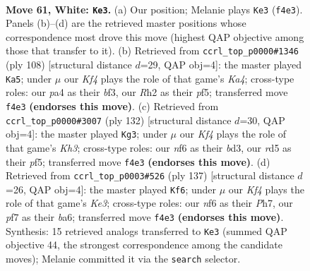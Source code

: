 \documentclass[11pt]{article}
\begin{document}
\clearpage

\begin{figure}[p]\centering
\begin{subfigure}{0.46\textwidth}\centering
\resizebox{\linewidth}{!}{%
\newchessgame
\chessboard[
  setfen={7k/5p2/5n2/3r4/pB3K1p/P4P1P/7R/8 w - - 1 61},
  showmover=false,
  pgfstyle=straightmove, color=movearrow, markmove={f4-e3}
]}
\caption{}
\end{subfigure}\hfill
\begin{subfigure}{0.46\textwidth}\centering
\resizebox{\linewidth}{!}{%
\newchessgame
\chessboard[
  setfen={8/7p/3B3P/2P2pp1/K1k5/P4bP1/8/8 w - - 1 55},
  showmover=false,
  pgfstyle=straightmove, color=movearrow, markmove={a4-a5}
]}
\caption{}
\end{subfigure}
\\[4pt]
\begin{subfigure}{0.46\textwidth}\centering
\resizebox{\linewidth}{!}{%
\newchessgame
\chessboard[
  setfen={8/7p/2p5/5p1k/p4P2/P1Bb3K/1P5P/8 w - - 17 67},
  showmover=false,
  pgfstyle=straightmove, color=movearrow, markmove={h3-g3}
]}
\caption{}
\end{subfigure}\hfill
\begin{subfigure}{0.46\textwidth}\centering
\resizebox{\linewidth}{!}{%
\newchessgame
\chessboard[
  setfen={3R4/2r4p/Bp2k3/2b2p1P/P1P2P2/8/6K1/8 b - - 58 69},
  showmover=false,
  pgfstyle=straightmove, color=movearrow, markmove={e6-f6}
]}
\caption{}
\end{subfigure}
\caption{\textbf{Move 61, White: \texttt{Ke3}.} (a) Our position; Melanie plays \texttt{Ke3} (\texttt{f4e3}). Panels (b)--(d) are the retrieved master positions whose correspondence most drove this move (highest QAP objective among those that transfer to it). (b) Retrieved from \texttt{ccrl\_top\_p0000\#1346} (ply 108) [structural distance $d$=29, QAP obj=4]: the master played \texttt{Ka5}; under $\mu$ our \emph{Kf4} plays the role of that game's \emph{Ka4}; cross-type roles: our \emph{p}a4 as their \emph{b}f3, our \emph{R}h2 as their \emph{p}f5; transferred move \texttt{f4e3} \textbf{(endorses this move)}. (c) Retrieved from \texttt{ccrl\_top\_p0000\#3007} (ply 132) [structural distance $d$=30, QAP obj=4]: the master played \texttt{Kg3}; under $\mu$ our \emph{Kf4} plays the role of that game's \emph{Kh3}; cross-type roles: our \emph{n}f6 as their \emph{b}d3, our \emph{r}d5 as their \emph{p}f5; transferred move \texttt{f4e3} \textbf{(endorses this move)}. (d) Retrieved from \texttt{ccrl\_top\_p0003\#526} (ply 137) [structural distance $d$=26, QAP obj=4]: the master played \texttt{Kf6}; under $\mu$ our \emph{Kf4} plays the role of that game's \emph{Ke3}; cross-type roles: our \emph{n}f6 as their \emph{P}h7, our \emph{p}f7 as their \emph{b}a6; transferred move \texttt{f4e3} \textbf{(endorses this move)}. Synthesis: 15 retrieved analogs transferred to \texttt{Ke3} (summed QAP objective 44, the strongest correspondence among the candidate moves); Melanie committed it via the \texttt{search} selector.}
\label{fig:thought-m120}
\end{figure}
\end{document}
